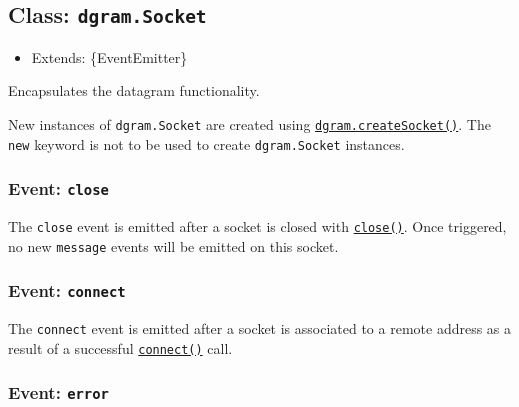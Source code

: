 \begin{Shaded}
\begin{Highlighting}[]
\NormalTok{(}\NormalTok{)}\OperatorTok{;}
\end{Highlighting}
\end{Shaded}

\subsection{\texorpdfstring{Class:
\texttt{dgram.Socket}}{Class: dgram.Socket}}\label{class-dgram.socket}

\begin{itemize}
\tightlist
\item
  Extends: \{EventEmitter\}
\end{itemize}

Encapsulates the datagram functionality.

New instances of \texttt{dgram.Socket} are created using
\hyperref[dgramcreatesocketoptions-callback]{\texttt{dgram.createSocket()}}.
The \texttt{new} keyword is not to be used to create
\texttt{dgram.Socket} instances.

\subsubsection{\texorpdfstring{Event:
\texttt{\textquotesingle{}close\textquotesingle{}}}{Event: \textquotesingle close\textquotesingle{}}}\label{event-close}

The \texttt{\textquotesingle{}close\textquotesingle{}} event is emitted
after a socket is closed with
\hyperref[socketclosecallback]{\texttt{close()}}. Once triggered, no new
\texttt{\textquotesingle{}message\textquotesingle{}} events will be
emitted on this socket.

\subsubsection{\texorpdfstring{Event:
\texttt{\textquotesingle{}connect\textquotesingle{}}}{Event: \textquotesingle connect\textquotesingle{}}}\label{event-connect}

The \texttt{\textquotesingle{}connect\textquotesingle{}} event is
emitted after a socket is associated to a remote address as a result of
a successful
\hyperref[socketconnectport-address-callback]{\texttt{connect()}} call.

\subsubsection{\texorpdfstring{Event:
\texttt{\textquotesingle{}error\textquotesingle{}}}{Event: \textquotesingle error\textquotesingle{}}}\label{event-error}

